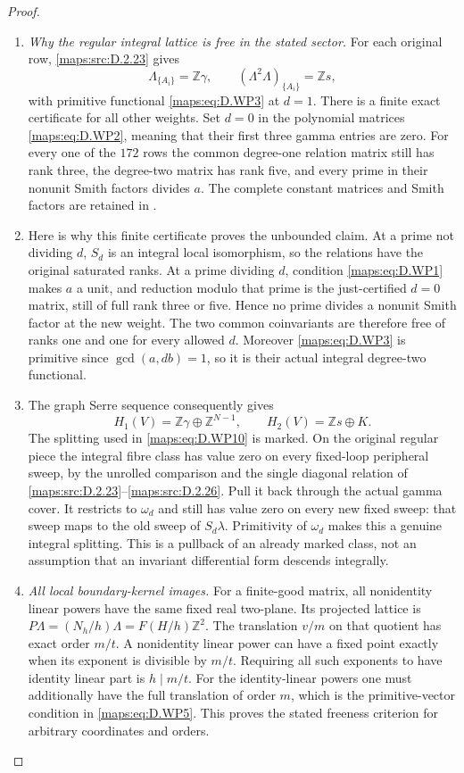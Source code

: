 \begin{proof}
\begin{enumerate}[label=\arabic*.,leftmargin=*]
\item \emph{Why the regular integral lattice is free in the stated sector.}
For each original row, \ref{maps:src:D.2.23} gives
\[
 \Lambda_{\{A_i\}}=\mathbb Z\gamma,\qquad
 (\Lambda^2\Lambda)_{\{A_i\}}=\mathbb Zs,
\]
with primitive functional \eqref{maps:eq:D.WP3} at $d=1$.
There is a finite exact certificate for all other
weights. Set $d=0$ in the polynomial matrices
\eqref{maps:eq:D.WP2}, meaning that their first three gamma
entries are zero. For every one of the $172$ rows
the common degree-one relation matrix still has
rank three, the degree-two matrix has rank five,
and every prime in their nonunit Smith factors
divides $a$. The complete constant matrices and
Smith factors are retained in
.

\item Here is why this finite certificate proves the
unbounded claim. At a prime not dividing $d$,
$S_d$ is an integral local isomorphism, so the
relations have the original saturated ranks.
At a prime dividing $d$, condition \eqref{maps:eq:D.WP1} makes
$a$ a unit, and reduction modulo that prime is
the just-certified $d=0$ matrix, still of full
rank three or five. Hence no prime divides a
nonunit Smith factor at the new weight.
The two common coinvariants are therefore free
of ranks one and one for every allowed $d$.
Moreover \eqref{maps:eq:D.WP3} is primitive since
$\gcd(a,db)=1$, so it is their actual integral
degree-two functional.

\item The graph Serre sequence consequently gives
\[
 H_1(V)=\mathbb Z\gamma\oplus\mathbb Z^{N-1},
 \qquad H_2(V)=\mathbb Zs\oplus K.                         \tag{D.WP10}\label{maps:eq:D.WP10}
\]
The splitting used in \eqref{maps:eq:D.WP10} is marked. On the
original regular piece the integral fibre class
has value zero on every fixed-loop peripheral
sweep, by the unrolled comparison and the single
diagonal relation of \ref{maps:src:D.2.23}--\ref{maps:src:D.2.26}. Pull it back
through the actual gamma cover. It restricts to
$\omega_d$ and still has value zero on every
new fixed sweep: that sweep maps to the old
sweep of $S_d\lambda$.
Primitivity of $\omega_d$ makes this a genuine
integral splitting. This is a pullback of an
already marked class, not an assumption that
an invariant differential form descends integrally.

\item \emph{All local boundary-kernel images.}
For a finite-good matrix, all nonidentity linear
powers have the same fixed real two-plane.
Its projected lattice is
$P\Lambda=(N_h/h)\Lambda=F(H/h)\mathbb Z^2$.
The translation $v/m$ on that quotient has exact
order $m/t$. A nonidentity linear power can have
a fixed point exactly when its exponent is
divisible by $m/t$. Requiring all such exponents
to have identity linear part is $h\mid m/t$.
For the identity-linear powers one must additionally
have the full translation of order $m$, which is
the primitive-vector condition in \eqref{maps:eq:D.WP5}.
This proves the stated freeness criterion for
arbitrary coordinates and orders.


\end{enumerate}
\end{proof}
